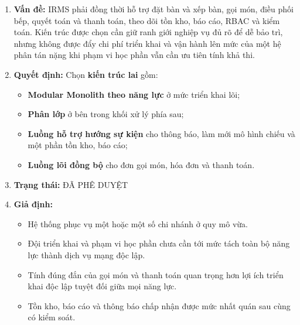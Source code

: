 \documentclass[11pt,a4paper]{article}
\begin{document}
\begin{adrbox}[title={ADR-01: Lựa Chọn Kiến Trúc Lai Cho IRMS}]
\begin{enumerate}[leftmargin=1.9em,label=\arabic*.]
  \item \textbf{Vấn đề:}
  IRMS phải đồng thời hỗ trợ đặt bàn và xếp bàn, gọi món, điều phối bếp,
  quyết toán và thanh toán, theo dõi tồn kho, báo cáo, RBAC và kiểm toán.
  Kiến trúc được chọn cần giữ ranh giới nghiệp vụ đủ rõ để dễ bảo trì,
  nhưng không được đẩy chi phí triển khai và vận hành lên mức của một hệ phân tán nặng
  khi phạm vi học phần vẫn cần ưu tiên tính khả thi.

  \item \textbf{Quyết định:}
  Chọn \textbf{kiến trúc lai} gồm:
  \begin{itemize}[leftmargin=1.8em]
    \item \textbf{Modular Monolith theo năng lực} ở mức triển khai lõi;
    \item \textbf{Phân lớp} ở bên trong khối xử lý phía sau;
    \item \textbf{Luồng hỗ trợ hướng sự kiện} cho thông báo, làm mới mô hình chiếu và một phần tồn kho, báo cáo;
    \item \textbf{Luồng lõi đồng bộ} cho đơn gọi món, hóa đơn và thanh toán.
  \end{itemize}

  \item \textbf{Trạng thái:} ĐÃ PHÊ DUYỆT

  \item \textbf{Giả định:}
  \begin{itemize}[leftmargin=1.8em]
    \item Hệ thống phục vụ một hoặc một số chi nhánh ở quy mô vừa.
    \item Đội triển khai và phạm vi học phần chưa cần tới mức tách toàn bộ năng lực thành dịch vụ mạng độc lập.
    \item Tính đúng đắn của gọi món và thanh toán quan trọng hơn lợi ích triển khai độc lập tuyệt đối giữa mọi năng lực.
    \item Tồn kho, báo cáo và thông báo chấp nhận được mức nhất quán sau cùng có kiểm soát.
  \end{itemize}


\end{enumerate}
\end{adrbox}
\end{document}
